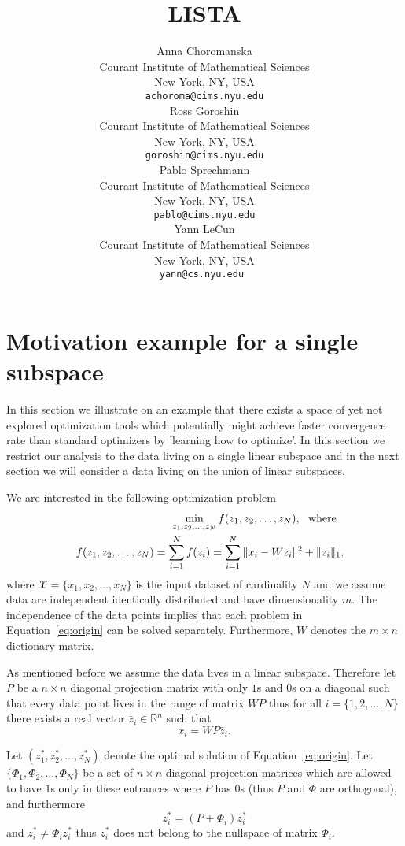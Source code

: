 \documentclass{article} %
\title{LISTA}
\author{
Anna Choromanska \\
Courant Institute of Mathematical Sciences \\
New York, NY, USA \\
\texttt{achoroma@cims.nyu.edu} \\
\And
Ross Goroshin \\
Courant Institute of Mathematical Sciences \\
New York, NY, USA \\
\texttt{goroshin@cims.nyu.edu} \\
\And
Pablo Sprechmann \\
Courant Institute of Mathematical Sciences \\
New York, NY, USA \\
\texttt{pablo@cims.nyu.edu} \\
\AND
Yann LeCun \\
Courant Institute of Mathematical Sciences \\
New York, NY, USA \\
\texttt{yann@cs.nyu.edu } 
}
\begin{document}
\maketitle

\begin{abstract}
\end{abstract}

\section{Motivation example for a single subspace}
In this section we illustrate on an example that there exists a space of yet not explored optimization tools which potentially might achieve faster convergence rate than standard optimizers by 'learning how to optimize'. In this section we restrict our analysis to the data living on a single linear subspace and in the next section we will consider a data living on the union of linear subspaces.

We are interested in the following optimization problem
\begin{eqnarray}
&&\min_{z_1,z_2,\dots,z_N} f(z_1,z_2,\dots,z_N),\text{\:\:\:where\:\:\:} \nonumber\\
&&f(z_1,z_2,\dots,z_N) = \sum_{i=1}^Nf(z_i) = \sum_{i=1}^N\|x_i - Wz_i\|^2 + \|z_i\|_1,
\label{eq:origin}
\end{eqnarray}
where $\mathcal{X} = \{x_1,x_2,\dots,x_N\}$ is the input dataset of cardinality $N$ and we assume data are independent identically distributed and have dimensionality $m$. The independence of the data points implies that each problem in Equation~\ref{eq:origin} can be solved separately. Furthermore, $W$ denotes the $m\times n$ dictionary matrix. 

As mentioned before we assume the data lives in a linear subspace. Therefore let $P$ be a $n \times n$ diagonal projection matrix with only $1$s and $0$s on a diagonal such that every data point lives in the range of matrix $WP$ thus for all $i = \{1,2,\dots,N\}$ there exists a real vector $\bar{z}_i \in \mathbb{R}^n$ such that
\[x_i = WP\bar{z}_i.
\]

Let $(z^{*}_1,z^{*}_2,\dots,z^{*}_N)$ denote the optimal solution of Equation~\ref{eq:origin}. Let $\{\Phi_1,\Phi_2,\dots,\Phi_N\}$ be a set of $n \times n$ diagonal projection matrices which are allowed to have $1$s only in these entrances where $P$ has $0$s (thus $P$ and $\Phi$ are orthogonal), and furthermore
\[z^{*}_i = (P + \Phi_i)z^{*}_i
\]
and $z^{*}_i \neq \Phi_i z^{*}_i$ thus $z^{*}_i$ does not belong to the nullspace of matrix $\Phi_i$.
\end{document}
